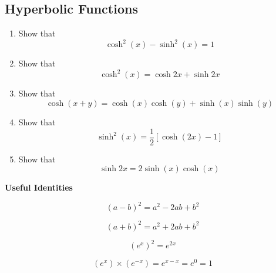 \documentclass[a4paper,12pt]{article}
\begin{document}
\subsection*{Hyperbolic Functions }
\begin{enumerate}
\item Show that \[ \cosh^2(x) - \sinh^2(x) = 1\]
		\item Show that \[\cosh^2 (x) = \cosh2x + \sinh2x\]	
		\item Show that \[ \cosh(x+y) = \cosh(x)\cosh(y) + \sinh(x)\sinh(y)\]
		\item Show that \[\sinh^2 (x) = \frac{1}{2}\left[\cosh(2x)-1\right]\]
	\item Show that \[\sinh2x = 2\sinh(x) \cosh(x) \]
	

\end{enumerate}




\begin{framed}
\noindent \textbf{Useful Identities}
	\begin{multicols}{2}
		\[ (a-b)^2 = a^2 -2ab +b^2 \]
		
		\[ (a+b)^2 = a^2 + 2ab +b^2 \]
		
		\[ (e^x)^2  = e^{2x} \]
		
		\[  (e^x) \times (e^{-x}) = e^{x-x} =e^0  =1  \]
	\end{multicols}
\end{framed}
\end{document}
